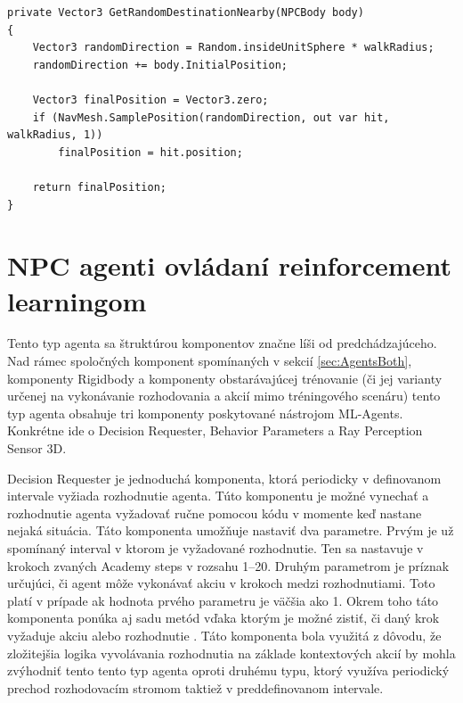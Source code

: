 \documentclass[slovak, master]{diploma}
\begin{document}
\vspace{8pt}
\begin{lstlisting}[label=src:GenRandom,caption={Generovanie náhodného bodu v okolí NPC pomocou NavMeshu}]
private Vector3 GetRandomDestinationNearby(NPCBody body)
{
    Vector3 randomDirection = Random.insideUnitSphere * walkRadius;
    randomDirection += body.InitialPosition;
    
    Vector3 finalPosition = Vector3.zero;
    if (NavMesh.SamplePosition(randomDirection, out var hit, walkRadius, 1))
        finalPosition = hit.position;

    return finalPosition;
}
\end{lstlisting}

\section{NPC agenti ovládaní reinforcement learningom}
\label{sec:AgentsWithBrain}
Tento typ agenta sa štruktúrou komponentov značne líši od predchádzajúceho. Nad rámec spoločných komponent spomínaných v sekcií \ref{sec:AgentsBoth}, komponenty Rigidbody a komponenty obstarávajúcej trénovanie (či jej varianty určenej na vykonávanie rozhodovania a akcií mimo tréningového scenáru) tento typ agenta obsahuje tri komponenty poskytované nástrojom ML-Agents. Konkrétne ide o Decision Requester, Behavior Parameters a Ray Perception Sensor 3D.

Decision Requester je jednoduchá komponenta, ktorá periodicky v definovanom intervale vyžiada rozhodnutie agenta. Túto komponentu je možné vynechať a rozhodnutie agenta vyžadovať ručne pomocou kódu v momente keď nastane nejaká situácia. Táto komponenta umožňuje nastaviť dva parametre. Prvým je už spomínaný interval v ktorom je vyžadované rozhodnutie. Ten sa nastavuje v krokoch zvaných Academy steps v rozsahu 1--20. Druhým parametrom je príznak určujúci, či agent môže vykonávať akciu v krokoch medzi rozhodnutiami. Toto platí v 
prípade ak hodnota prvého parametru je väčšia ako 1. Okrem toho táto komponenta ponúka aj sadu metód vďaka ktorým je možné zistiť, či daný krok vyžaduje akciu alebo rozhodnutie \cite{decReq}. Táto komponenta bola využitá z dôvodu, že zložitejšia logika vyvolávania rozhodnutia na základe kontextových akcií by mohla zvýhodniť tento tento typ agenta oproti druhému typu, ktorý využíva periodický prechod rozhodovacím stromom taktiež v preddefinovanom intervale. 
\end{document}

